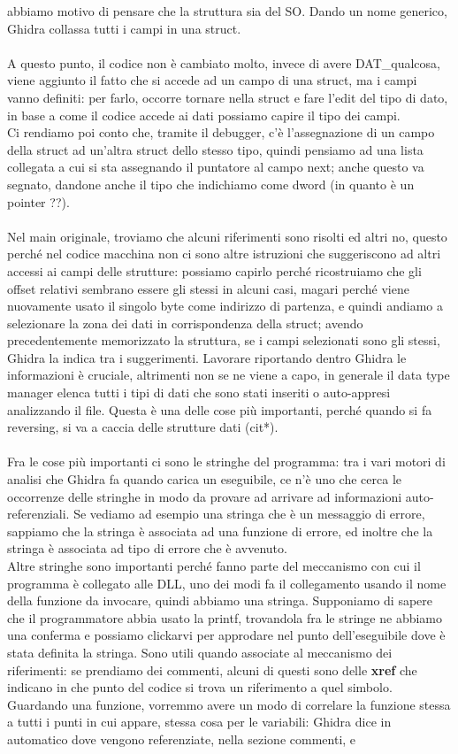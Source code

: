\documentclass[12pt, oneside]{extbook}
\begin{document}
abbiamo motivo di pensare che la struttura sia del SO. Dando un nome generico, Ghidra collassa tutti i campi in una struct.\\\\ A questo punto, il codice non è cambiato molto, invece di avere DAT\_qualcosa, viene aggiunto il fatto che si accede ad un campo di una struct, ma i campi vanno definiti: per farlo, occorre tornare nella struct e fare l'edit del tipo di dato, in base a come il codice accede ai dati possiamo capire il tipo dei campi.\\ Ci rendiamo poi conto che, tramite il debugger, c'è l'assegnazione di un campo della struct ad un'altra struct dello stesso tipo, quindi pensiamo ad una lista collegata a cui si sta assegnando il puntatore al campo next; anche questo va segnato, dandone anche il tipo che indichiamo come dword (in quanto è un pointer ??).\\\\ Nel main originale, troviamo che alcuni riferimenti sono risolti ed altri no, questo perché nel codice macchina non ci sono altre istruzioni che suggeriscono ad altri accessi ai campi delle strutture: possiamo capirlo perché ricostruiamo che gli offset relativi sembrano essere gli stessi in alcuni casi, magari perché viene nuovamente usato il singolo byte come indirizzo di partenza, e quindi andiamo a selezionare la zona dei dati in corrispondenza della struct; avendo precedentemente memorizzato la struttura, se i campi selezionati sono gli stessi, Ghidra la indica tra i suggerimenti. Lavorare riportando dentro Ghidra le informazioni è cruciale, altrimenti non se ne viene a capo, in generale il data type manager elenca tutti i tipi di dati che sono stati inseriti o auto-appresi analizzando il file. Questa è una delle cose più importanti, perché quando si fa reversing, si va a caccia delle strutture dati (cit*). \\\\ Fra le cose più importanti ci sono le stringhe del programma: tra i vari motori di analisi che Ghidra fa quando carica un eseguibile, ce n'è uno che cerca le occorrenze delle stringhe in modo da provare ad arrivare ad informazioni auto-referenziali. Se vediamo ad esempio una stringa che è un messaggio di errore, sappiamo che la stringa è associata ad una funzione di errore, ed inoltre che la stringa è associata ad tipo di errore che è avvenuto.\\ Altre stringhe sono importanti perché fanno parte del meccanismo con cui il programma è collegato alle DLL, uno dei modi fa il collegamento usando il nome della funzione da invocare, quindi abbiamo una stringa. Supponiamo di sapere che il programmatore abbia usato la printf, trovandola fra le stringe ne abbiamo una conferma e possiamo clickarvi per approdare nel punto dell'eseguibile dove è stata definita la stringa. Sono utili quando associate al meccanismo dei riferimenti: se prendiamo dei commenti, alcuni di questi sono delle \textbf{xref} che indicano in che punto del codice si trova un riferimento a quel simbolo. Guardando una funzione, vorremmo avere un modo di correlare la funzione stessa a tutti i punti in cui appare, stessa cosa per le variabili: Ghidra dice in automatico dove vengono referenziate, nella sezione commenti, e 
\end{document}
